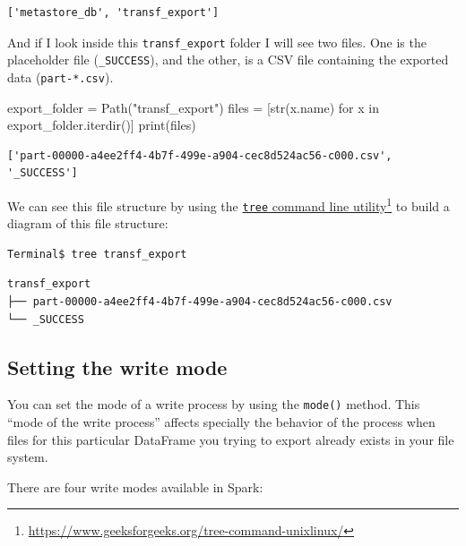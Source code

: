 \documentclass[
  11pt,
  letterpaper,
  DIV=11,
  numbers=noendperiod]{scrreprt}
\newenvironment{Shaded}{\begin{snugshade}}{\end{snugshade}}
\newcommand{\BuiltInTok}[1]{\textcolor[rgb]{0.00,0.23,0.31}{#1}}
\newcommand{\ControlFlowTok}[1]{\textcolor[rgb]{0.00,0.23,0.31}{#1}}
\newcommand{\KeywordTok}[1]{\textcolor[rgb]{0.00,0.23,0.31}{#1}}
\newcommand{\NormalTok}[1]{\textcolor[rgb]{0.00,0.23,0.31}{#1}}
\newcommand{\OperatorTok}[1]{\textcolor[rgb]{0.37,0.37,0.37}{#1}}
\newcommand{\StringTok}[1]{\textcolor[rgb]{0.13,0.47,0.30}{#1}}
\begin{document}
\begin{verbatim}
['metastore_db', 'transf_export']
\end{verbatim}

And if I look inside this \texttt{transf\_export} folder I will see two
files. One is the placeholder file (\texttt{\_SUCCESS}), and the other,
is a CSV file containing the exported data (\texttt{part-*.csv}).

\begin{Shaded}
\begin{Highlighting}[]
\NormalTok{export\_folder }\OperatorTok{=}\NormalTok{ Path(}\StringTok{"transf\_export"}\NormalTok{)}
\NormalTok{files }\OperatorTok{=}\NormalTok{ [}\BuiltInTok{str}\NormalTok{(x.name) }\ControlFlowTok{for}\NormalTok{ x }\KeywordTok{in}\NormalTok{ export\_folder.iterdir()]}
\BuiltInTok{print}\NormalTok{(files)}
\end{Highlighting}
\end{Shaded}

\begin{verbatim}
['part-00000-a4ee2ff4-4b7f-499e-a904-cec8d524ac56-c000.csv', '_SUCCESS']
\end{verbatim}

We can see this file structure by using the
\href{https://www.geeksforgeeks.org/tree-command-unixlinux/}{\texttt{tree}
command line utility}\footnote{\url{https://www.geeksforgeeks.org/tree-command-unixlinux/}}
to build a diagram of this file structure:

\begin{verbatim}
Terminal$ tree transf_export
\end{verbatim}

\begin{verbatim}
transf_export
├── part-00000-a4ee2ff4-4b7f-499e-a904-cec8d524ac56-c000.csv
└── _SUCCESS
\end{verbatim}

\hypertarget{setting-the-write-mode}{%
\subsection{Setting the write mode}\label{setting-the-write-mode}}

You can set the mode of a write process by using the \texttt{mode()}
method. This ``mode of the write process'' affects specially the
behavior of the process when files for this particular DataFrame you
trying to export already exists in your file system.

There are four write modes available in Spark:
\end{document}
